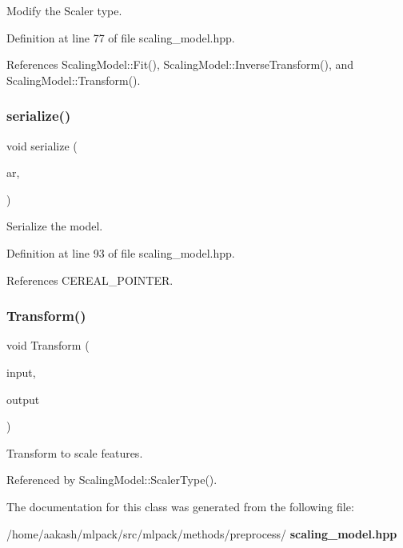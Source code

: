 Modify the Scaler type. 



Definition at line 77 of file scaling\+\_\+model.\+hpp.



References Scaling\+Model\+::\+Fit(), Scaling\+Model\+::\+Inverse\+Transform(), and Scaling\+Model\+::\+Transform().

\mbox{\label{classmlpack_1_1data_1_1ScalingModel_a65cba07328997659bec80b9879b15a51}} 
\subsubsection{serialize()}
{\footnotesize\ttfamily void serialize (\begin{DoxyParamCaption}\item[{Archive \&}]{ar,  }\item[{const uint32\+\_\+t}]{ }\end{DoxyParamCaption})\hspace{0.3cm}{\ttfamily [inline]}}



Serialize the model. 



Definition at line 93 of file scaling\+\_\+model.\+hpp.



References C\+E\+R\+E\+A\+L\+\_\+\+P\+O\+I\+N\+T\+ER.

\mbox{\label{classmlpack_1_1data_1_1ScalingModel_a7bc470a1e097f5b0aaf2396691432b3f}} 
\subsubsection{Transform()}
{\footnotesize\ttfamily void Transform (\begin{DoxyParamCaption}\item[{const Mat\+Type \&}]{input,  }\item[{Mat\+Type \&}]{output }\end{DoxyParamCaption})}



Transform to scale features. 



Referenced by Scaling\+Model\+::\+Scaler\+Type().



The documentation for this class was generated from the following file\+:\begin{DoxyCompactItemize}
\item 
/home/aakash/mlpack/src/mlpack/methods/preprocess/\textbf{ scaling\+\_\+model.\+hpp}\end{DoxyCompactItemize}
